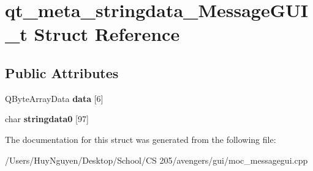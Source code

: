 \hypertarget{structqt__meta__stringdata__MessageGUI__t}{}\section{qt\+\_\+meta\+\_\+stringdata\+\_\+\+Message\+G\+U\+I\+\_\+t Struct Reference}
\label{structqt__meta__stringdata__MessageGUI__t}
\subsection*{Public Attributes}
\begin{DoxyCompactItemize}
\item 
Q\+Byte\+Array\+Data {\bfseries data} \mbox{[}6\mbox{]}\hypertarget{structqt__meta__stringdata__MessageGUI__t_ab9947fab01cc2e131d50fcc8813dd571}{}\label{structqt__meta__stringdata__MessageGUI__t_ab9947fab01cc2e131d50fcc8813dd571}

\item 
char {\bfseries stringdata0} \mbox{[}97\mbox{]}\hypertarget{structqt__meta__stringdata__MessageGUI__t_aa3b278ce933bc3f23e929704402bca02}{}\label{structqt__meta__stringdata__MessageGUI__t_aa3b278ce933bc3f23e929704402bca02}

\end{DoxyCompactItemize}


The documentation for this struct was generated from the following file\+:\begin{DoxyCompactItemize}
\item 
/\+Users/\+Huy\+Nguyen/\+Desktop/\+School/\+C\+S 205/avengers/gui/moc\+\_\+messagegui.\+cpp\end{DoxyCompactItemize}
